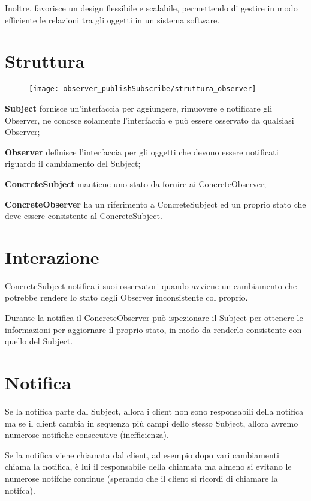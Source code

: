 Inoltre, favorisce un design flessibile e scalabile, permettendo di gestire in modo efficiente le relazioni tra gli oggetti in un sistema software.

\section{Struttura}

\begin{figure}[H]
    \centering
    \texttt{[image: observer\_publishSubscribe/struttura\_observer]}
\end{figure}

\textbf{Subject} fornisce un'interfaccia per aggiungere, rimuovere e notificare gli Observer, ne conosce solamente l'interfaccia e può essere osservato da qualsiasi 
Observer;

\textbf{Observer} definisce l'interfaccia per gli oggetti che devono essere notificati riguardo il cambiamento del Subject;

\textbf{ConcreteSubject} mantiene uno stato da fornire ai ConcreteObserver;

\textbf{ConcreteObserver} ha un riferimento a ConcreteSubject ed un proprio stato che deve essere consistente al ConcreteSubject. 

\section{Interazione}

ConcreteSubject notifica i suoi osservatori quando avviene un cambiamento che potrebbe rendere lo stato degli Observer inconsistente col proprio.

Durante la notifica il ConcreteObserver può ispezionare il Subject per ottenere le informazioni per aggiornare il proprio stato, in modo da renderlo consistente con
quello del Subject.

\section{Notifica}

Se la notifica parte dal Subject, allora i client non sono responsabili della notifica ma se il client cambia in sequenza più campi dello stesso Subject, allora 
avremo numerose notifiche consecutive (inefficienza).

Se la notifica viene chiamata dal client, ad esempio dopo vari cambiamenti chiama la notifica, è lui il responsabile della chiamata ma almeno si evitano le numerose 
notifche continue (sperando che il client si ricordi di chiamare la notifca).

